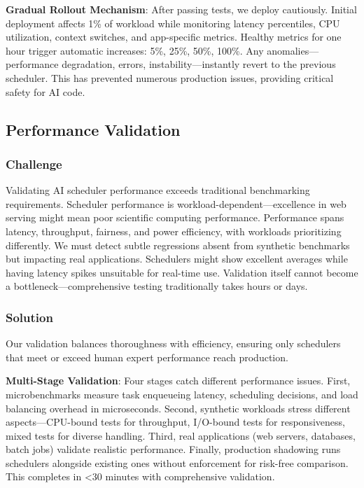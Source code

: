 \textbf{Gradual Rollout Mechanism}: After passing tests, we deploy cautiously. Initial deployment affects 1\% of workload while monitoring latency percentiles, CPU utilization, context switches, and app-specific metrics. Healthy metrics for one hour trigger automatic increases: 5\%, 25\%, 50\%, 100\%. Any anomalies—performance degradation, errors, instability—instantly revert to the previous scheduler. This has prevented numerous production issues, providing critical safety for AI code.

\subsection{Performance Validation}

\subsubsection{Challenge}
Validating AI scheduler performance exceeds traditional benchmarking requirements. Scheduler performance is workload-dependent—excellence in web serving might mean poor scientific computing performance. Performance spans latency, throughput, fairness, and power efficiency, with workloads prioritizing differently. We must detect subtle regressions absent from synthetic benchmarks but impacting real applications. Schedulers might show excellent averages while having latency spikes unsuitable for real-time use. Validation itself cannot become a bottleneck—comprehensive testing traditionally takes hours or days.

\subsubsection{Solution}
Our validation balances thoroughness with efficiency, ensuring only schedulers that meet or exceed human expert performance reach production.

\textbf{Multi-Stage Validation}: Four stages catch different performance issues. First, microbenchmarks measure task enqueueing latency, scheduling decisions, and load balancing overhead in microseconds. Second, synthetic workloads stress different aspects—CPU-bound tests for throughput, I/O-bound tests for responsiveness, mixed tests for diverse handling. Third, real applications (web servers, databases, batch jobs) validate realistic performance. Finally, production shadowing runs schedulers alongside existing ones without enforcement for risk-free comparison. This completes in <30 minutes with comprehensive validation.

